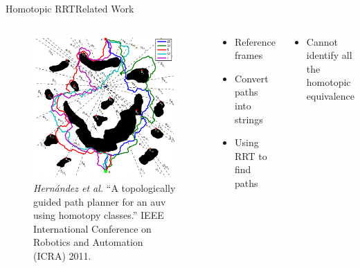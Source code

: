 \begin{frame}{Homotopic RRT}{Related Work}

\begin{columns}

\begin{figure}
	\centering
	\includegraphics[width=\linewidth]{figure/homotopic_rrt}
	\caption{\tiny {\it Hernández et al.} ``A topologically guided path planner for an auv using homotopy classes.'' IEEE International Conference on Robotics and Automation (ICRA) 2011.}
\end{figure}

\begin{block}{}
\begin{itemize}
\item Reference frames
\item Convert paths into strings
\item Using RRT to find paths
\end{itemize}
\end{block}

\begin{block}{}
	\begin{itemize}
		\item Cannot identify all the homotopic equivalence
	\end{itemize}
\end{block}
\end{columns}

\end{frame}

